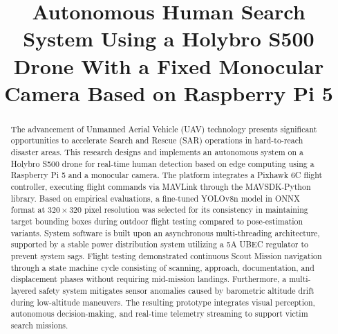 \documentclass[conference]{IEEEtran}
\begin{document}
	
	\title{Autonomous Human Search System Using a Holybro S500 Drone With a Fixed Monocular Camera Based on Raspberry Pi 5}
	
	\author{
		\and
		\and
	}
	
	\maketitle
	
	\begin{abstract}
The advancement of Unmanned Aerial Vehicle (UAV) technology presents significant opportunities to accelerate Search and Rescue (SAR) operations in hard-to-reach disaster areas. This research designs and implements an autonomous system on a Holybro S500 drone for real-time human detection based on edge computing using a Raspberry Pi 5 and a monocular camera. The platform integrates a Pixhawk 6C flight controller, executing flight commands via MAVLink through the MAVSDK-Python library. Based on empirical evaluations, a fine-tuned YOLOv8n model in ONNX format at $320 \times 320$ pixel resolution was selected for its consistency in maintaining target bounding boxes during outdoor flight testing compared to pose-estimation variants. System software is built upon an asynchronous multi-threading architecture, supported by a stable power distribution system utilizing a 5A UBEC regulator to prevent system sags. Flight testing demonstrated continuous Scout Mission navigation through a state machine cycle consisting of scanning, approach, documentation, and displacement phases without requiring mid-mission landings. Furthermore, a multi-layered safety system mitigates sensor anomalies caused by barometric altitude drift during low-altitude maneuvers. The resulting prototype integrates visual perception, autonomous decision-making, and real-time telemetry streaming to support victim search missions.
\end{abstract}
	
\end{document}
